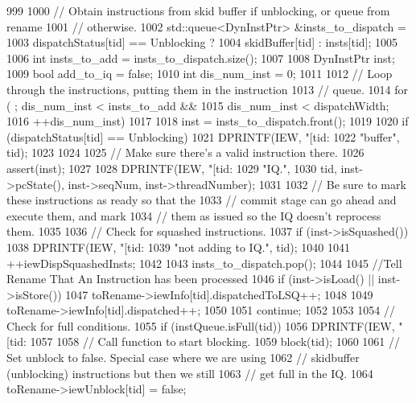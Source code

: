 \begin{DoxyCode}
999 {
1000     // Obtain instructions from skid buffer if unblocking, or queue from rename
1001     // otherwise.
1002     std::queue<DynInstPtr> &insts_to_dispatch =
1003         dispatchStatus[tid] == Unblocking ?
1004         skidBuffer[tid] : insts[tid];
1005 
1006     int insts_to_add = insts_to_dispatch.size();
1007 
1008     DynInstPtr inst;
1009     bool add_to_iq = false;
1010     int dis_num_inst = 0;
1011 
1012     // Loop through the instructions, putting them in the instruction
1013     // queue.
1014     for ( ; dis_num_inst < insts_to_add &&
1015               dis_num_inst < dispatchWidth;
1016           ++dis_num_inst)
1017     {
1018         inst = insts_to_dispatch.front();
1019 
1020         if (dispatchStatus[tid] == Unblocking) {
1021             DPRINTF(IEW, "[tid:%
1022                     "buffer\n", tid);
1023         }
1024 
1025         // Make sure there's a valid instruction there.
1026         assert(inst);
1027 
1028         DPRINTF(IEW, "[tid:%
1029                 "IQ.\n",
1030                 tid, inst->pcState(), inst->seqNum, inst->threadNumber);
1031 
1032         // Be sure to mark these instructions as ready so that the
1033         // commit stage can go ahead and execute them, and mark
1034         // them as issued so the IQ doesn't reprocess them.
1035 
1036         // Check for squashed instructions.
1037         if (inst->isSquashed()) {
1038             DPRINTF(IEW, "[tid:%
1039                     "not adding to IQ.\n", tid);
1040 
1041             ++iewDispSquashedInsts;
1042 
1043             insts_to_dispatch.pop();
1044 
1045             //Tell Rename That An Instruction has been processed
1046             if (inst->isLoad() || inst->isStore()) {
1047                 toRename->iewInfo[tid].dispatchedToLSQ++;
1048             }
1049             toRename->iewInfo[tid].dispatched++;
1050 
1051             continue;
1052         }
1053 
1054         // Check for full conditions.
1055         if (instQueue.isFull(tid)) {
1056             DPRINTF(IEW, "[tid:%
1057 
1058             // Call function to start blocking.
1059             block(tid);
1060 
1061             // Set unblock to false. Special case where we are using
1062             // skidbuffer (unblocking) instructions but then we still
1063             // get full in the IQ.
1064             toRename->iewUnblock[tid] = false;
}}}
\end{DoxyCode}
